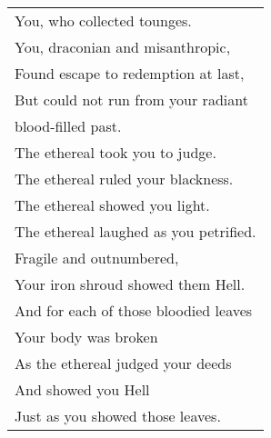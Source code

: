 \documentclass{article}
\begin{document}
\begin{center}
\begin{tabular}{l}
You, who collected tounges. \\
You, draconian and misanthropic, \\
Found escape to redemption at last, \\
But could not run from your radiant \\
blood-filled past. \\
The ethereal took you to judge. \\
The ethereal ruled your blackness. \\
The ethereal showed you light. \\
The ethereal laughed as you petrified. \\
Fragile and outnumbered, \\
Your iron shroud showed them Hell. \\
And for each of those bloodied leaves \\
Your body was broken \\
As the ethereal judged your deeds \\
And showed you Hell \\
Just as you showed those leaves.\\
\end{tabular}
\end{center}

\newpage
\end{document}
